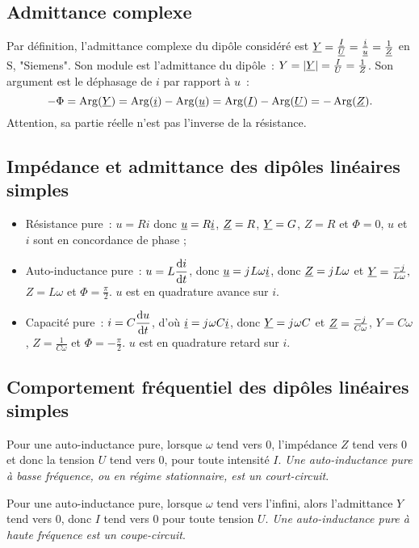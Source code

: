     \subsection{Admittance complexe}
        Par définition, l'admittance complexe du dipôle considéré est \(\underline{Y} = \frac{\underline{I}}{\underline{U}}=\frac{\underline{i}}{\underline{u}}=\frac{1}{\underline{Z}}\) en \(\si{\siemens}\), "Siemens". Son module est l'admittance du dipôle~: \(Y = \left\lvert\underline{Y}\right\rvert = \frac{I}{U} = \frac{1}{Z}\). Son argument est le déphasage de \(i\) par rapport à \(u\)~:
        \begin{equation}
            -\Phi = \operatorname{Arg}(\underline{Y}) = \operatorname{Arg}(\underline{i}) - \operatorname{Arg}(\underline{u}) = \operatorname{Arg}(\underline{I}) - \operatorname{Arg}(\underline{U}) = -\operatorname{Arg}(\underline{Z}).
        \end{equation}
        Attention, sa partie réelle n'est pas l'inverse de la résistance.
    \subsection{Impédance et admittance des dipôles linéaires simples}
        \begin{itemize}
            \item Résistance pure~: \(u=Ri\) donc \(\underline{u} = R \underline{i}\), \(\underline{Z} =R\), \(\underline{Y} = G\), \(Z=R\) et \(\Phi=0\), \(u\) et \(i\) sont en concordance de phase ;
            \item Auto-inductance pure~: \(u=L\dfrac{\mathrm{d} i}{\mathrm{d} t}\), donc \(\underline{u} = {j\mkern1mu} L \omega \underline{i}\), donc \(\underline{Z} = {j\mkern1mu} L\omega\) et \(\underline{Y} = \frac{-{j\mkern1mu}}{L\omega},\) \(Z=L\omega\) et \(\Phi=\frac{\pi}{2}\). \(u\) est en quadrature avance sur \(i\).
            \item Capacité pure~: \(i=C\dfrac{\mathrm{d} u}{\mathrm{d} t}\), d'où \(\underline{i} = {j\mkern1mu}\omega C \underline{i}\), donc \(\underline{Y} = {j\mkern1mu}\omega C\) et \(\underline{Z} = \frac{-{j\mkern1mu}}{C\omega}\), \(Y=C\omega\), \(Z=\frac{1}{C\omega}\) et \(\Phi = -\frac{\pi}{2}\). \(u\) est en quadrature retard sur \(i\).
        \end{itemize}
    \subsection{Comportement fréquentiel des dipôles linéaires simples}
        Pour une auto-inductance pure, lorsque \(\omega\) tend vers 0, l'impédance \(Z\) tend vers 0 et donc la tension \(U\) tend vers 0, pour toute intensité \(I\). \emph{Une auto-inductance pure à basse fréquence, ou en régime stationnaire, est un court-circuit}.

        Pour une auto-inductance pure, lorsque \(\omega\) tend vers l'infini, alors l'admittance \(Y\) tend vers 0, donc \(I\) tend vers 0 pour toute tension \(U\). \emph{Une auto-inductance pure à haute fréquence est un coupe-circuit}.

